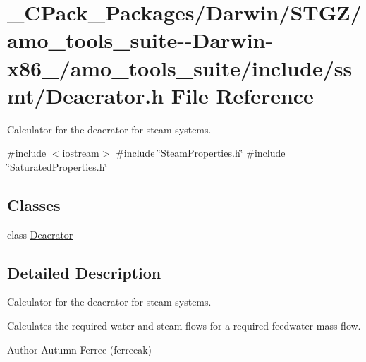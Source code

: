 \hypertarget{___c_pack___packages_2_darwin_2_s_t_g_z_2amo__tools__suite--_darwin-x86__64_2amo__tools__suite_2include_2ssmt_2_deaerator_8h}{}\section{\+\_\+\+C\+Pack\+\_\+\+Packages/\+Darwin/\+S\+T\+G\+Z/amo\+\_\+tools\+\_\+suite-\/-\/\+Darwin-\/x86\+\_/amo\+\_\+tools\+\_\+suite/include/ssmt/\+Deaerator.h File Reference}
\label{___c_pack___packages_2_darwin_2_s_t_g_z_2amo__tools__suite--_darwin-x86__64_2amo__tools__suite_2include_2ssmt_2_deaerator_8h}


Calculator for the deaerator for steam systems.  


{\ttfamily \#include $<$iostream$>$}\newline
{\ttfamily \#include \char`\"{}Steam\+Properties.\+h\char`\"{}}\newline
{\ttfamily \#include \char`\"{}Saturated\+Properties.\+h\char`\"{}}\newline
\subsection*{Classes}
\begin{DoxyCompactItemize}
\item 
class \hyperlink{class_deaerator}{Deaerator}
\end{DoxyCompactItemize}


\subsection{Detailed Description}
Calculator for the deaerator for steam systems. 

Calculates the required water and steam flows for a required feedwater mass flow.

\begin{DoxyAuthor}{Author}
Autumn Ferree (ferreeak) 
\end{DoxyAuthor}

